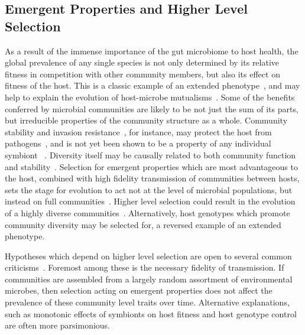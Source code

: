 \documentclass[12pt]{article}
\begin{document}
\subsection{Emergent Properties and Higher Level Selection}
As a result of the immense importance of the gut microbiome to host health,
the global prevalence of any single species is not only determined by its
relative fitness in competition with other community members,
but also its effect on fitness of the host.
This is a classic example of an extended phenotype~\citep{Dawkins1982},
and may help to explain
the evolution of host-microbe mutualisms~\citep{Dethlefsen2007a}.
Some of the benefits conferred by microbial communities
are likely to be not just the sum of its parts,
but irreducible properties of the community structure as a whole.
Community stability and invasion resistance~\citep{Levine1999},
for instance, may protect the host from pathogens~\citep{Lozupone2012},
and is not yet been shown to be a property of any individual symbiont%
~\citep{Cordero2014}.
Diversity itself may be causally related to both community function and
stability~\citep[reviewed in][]{McCann2000}.
Selection for emergent properties which are most advantageous to the host,
combined with high fidelity transmission of communities between hosts,
sets the stage for evolution to act not at the level of microbial populations,
but instead on full communities~\citep{Swenson2000,Ley2006}.
Higher level selection could result in the evolution of a highly diverse
communities~\citep{Hutchinson1959}.
Alternatively, host genotypes which promote community diversity may be
selected for,
a reversed example of an extended phenotype.

Hypotheses which depend on higher level selection are open to several common
criticisms~\citep{Wade1978}.
Foremost among these is the necessary fidelity of transmission.
If communities are assembled from a largely random assortment of environmental
microbes,
then selection acting on emergent properties does not affect the prevalence
of these community level traits over time.
Alternative explanations, such as monotonic effects of symbionts on host
fitness and host genotype control are often more parsimonious.
\end{document}
